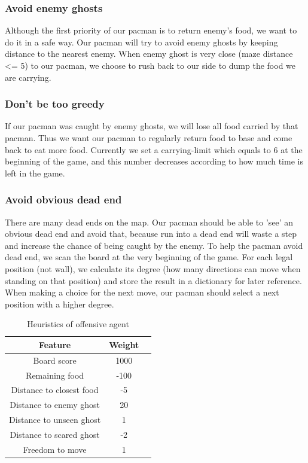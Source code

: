 \subsubsection{Avoid enemy ghosts}
Although the first priority of our pacman is to return enemy's food, we want 
to do it in a safe way. Our pacman will try to avoid enemy ghosts by keeping 
distance to the nearest enemy. When enemy ghost is very close (maze distance <= 5) 
to our pacman, we choose to rush back to our side to dump the food we are carrying.

\subsubsection{Don't be too greedy}
If our pacman was caught by enemy ghosts, we will lose all food carried by 
that pacman. Thus we want our pacman to regularly return food to base and 
come back to eat more food. Currently we set a carrying-limit which equals 
to 6 at the beginning of the game, and this number decreases according to 
how much time is left in the game.

\subsubsection{Avoid obvious dead end}
There are many dead ends on the map. Our pacman should be able to 'see' an 
obvious dead end and avoid that, because run into a dead end will waste a 
step and increase the chance of being caught by the enemy. To help the pacman 
avoid dead end,  we scan the board at the very beginning of the game. For each 
legal position (not wall), we calculate its degree (how many directions can 
move when standing on that position) and store the result in a dictionary 
for later reference. When making a choice for the next move, our pacman should 
select a next position with a higher degree.


\begin{table}[!htb]
  \caption{Heuristics of offensive agent}
  \label{1}
  \begin{tabular}{ccl}
    \toprule
    Feature&Weight\\
    \midrule
    Board score & 1000\\
    Remaining food & -100\\
    Distance to closest food & -5\\
    Distance to enemy ghost & 20\\
    Distance to unseen ghost & 1\\
    Distance to scared ghost & -2\\
    Freedom to move & 1\\
  \bottomrule
\end{tabular}
\end{table}

